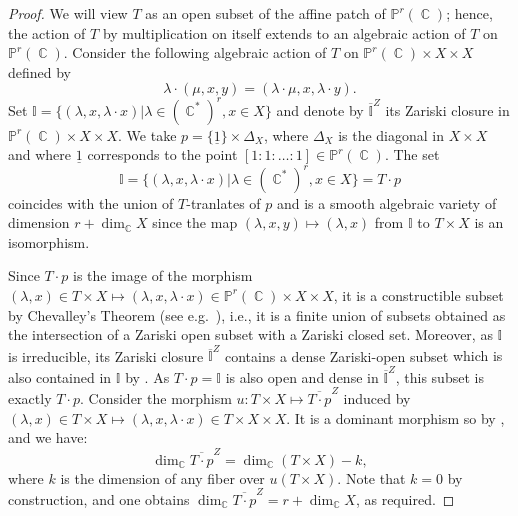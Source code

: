 \documentclass[12pt]{amsbook}%
\theoremstyle{definition}
\theoremstyle{remark}
\numberwithin{section}{chapter}
\numberwithin{subsection}{section}
\numberwithin{figure}{chapter}
\DeclareMathOperator{\C}{\mathbb{C}}
\newcommand\bac[1]{{\color{blue} #1} }
\def\bP{{\mathbb{P}}}
\def\zhao{\color{red}}
\begin{document}
{{\begin{proof} %
We will view $T$ as an open subset of the affine patch of $\bP^r(\C)$; hence, the action of $T$ by multiplication on itself extends to an  algebraic action of $T$ 
on  $\bP^r(\C)$. Consider the following algebraic action of $T$ on $\bP^r(\C) \times X \times X$ defined by %
\begin{equation*}
\lambda \cdot (\mu, x, y) = (\lambda \cdot \mu , x, \lambda \cdot y).
\end{equation*} 
Set $\mathbb{I} =\{(\lambda, x, \lambda\cdot  x) | \lambda\in (\C^*)^r , x\in X \} $ and denote by $\overline{\mathbb{I}}^Z$ its Zariski closure in 
$\bP^r(\C) \times X \times X$.
We take $p = \{ \underline{1} \} \times \Delta_X$, where $\Delta_X$ is the diagonal in $X\times X$ and where $\underline{1}$ corresponds to the point $[1 : 1 : \ldots : 1] \in \bP^r(\C)$. 
The set 
$$\mathbb{I} =  \{(\lambda, x, \lambda\cdot  x) | \lambda\in (\C^*)^r , x\in X \} = T \cdot p$$ 
coincides with  the union of $T$-tranlates of $p$ and is a smooth algebraic variety of dimension $r + \dim_{\C} X$  since the map $(\lambda, x , y) \mapsto  (\lambda, x)$  from $\mathbb{I}$ to $T \times X$ is an isomorphism.  

Since $T \cdot p$ is the image of the morphism 
$ (\lambda,x) \in T\times X \mapsto (\lambda,x,\lambda\cdot x) \in \bP^r(\C) \times X \times X$, it is a constructible subset by Chevalley's Theorem (see  e.g.\ \cite[Chapter 2, \S 6.E, Theorem 6]{matsumura}), i.e., it is a finite union of subsets obtained as the intersection of a Zariski open subset with a Zariski closed set. Moreover, as $\mathbb{I}$ is irreducible, its Zariski closure $\overline{\mathbb{I}}^Z$ contains a dense Zariski-open subset { which is also contained in $\mathbb{I}$} by \cite[Lemma 1.4.5]{tauvel_yu}. 
As $T\cdot p = \mathbb{I}$ is also open and dense in $\overline{\mathbb{I}}^Z$, this  subset is exactly $T\cdot p$.  
Consider  the morphism $u \colon T \times X  \mapsto \overline{T \cdot p}^Z$ induced  by $(\lambda, x) \in T \times X \mapsto (\lambda, x, \lambda \cdot x) \in T \times X \times X$. It is a dominant morphism so by \cite[Part (ii) of Corollary 15.5.5]{tauvel_yu}, and we have: 
\begin{equation*}
\dim_{\C} \overline{ T\cdot p}^Z = \dim_{\C} (T\times X) - k,
\end{equation*}
where $k$ is the dimension of any fiber over $u(T\times X)$. Note that $k=0$ by construction, and one obtains 
$\dim_{\C} \overline{ T\cdot p}^Z = r + \dim_{\C} X$, as required. \end{proof}

}}
\end{document}
